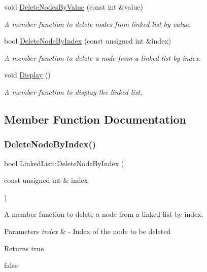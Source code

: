\begin{DoxyCompactItemize}
void \hyperlink{classLinkedList_ad40c682e5045bc595f1dab1d798822b6}{Delete\+Nodes\+By\+Value} (const int \&value)
\begin{DoxyCompactList}\small\item\em A member function to delete nodes from linked list by value. \end{DoxyCompactList}\item 
bool \hyperlink{classLinkedList_a52e846cd8e1f38de40fce3ff2f55a2ef}{Delete\+Node\+By\+Index} (const unsigned int \&index)
\begin{DoxyCompactList}\small\item\em A member function to delete a node from a linked list by index. \end{DoxyCompactList}\item 
\mbox{\label{classLinkedList_a64878c073bb7ef15927e67d79a7a2cc0}} 
void \hyperlink{classLinkedList_a64878c073bb7ef15927e67d79a7a2cc0}{Display} ()
\begin{DoxyCompactList}\small\item\em A member function to display the linked list. \end{DoxyCompactList}\end{DoxyCompactItemize}


\subsection{Member Function Documentation}
\mbox{\label{classLinkedList_a52e846cd8e1f38de40fce3ff2f55a2ef}} 
\subsubsection{\texorpdfstring{Delete\+Node\+By\+Index()}{DeleteNodeByIndex()}}
{\footnotesize\ttfamily bool Linked\+List\+::\+Delete\+Node\+By\+Index (\begin{DoxyParamCaption}\item[{const unsigned int \&}]{index }\end{DoxyParamCaption})}



A member function to delete a node from a linked list by index. 


\begin{DoxyParams}{Parameters}
{\em index} & -\/ Index of the node to be deleted \\
\hline
\end{DoxyParams}
\begin{DoxyReturn}{Returns}
true 

false 
\end{DoxyReturn}
\mbox{\label{classLinkedList_ad40c682e5045bc595f1dab1d798822b6}} 
